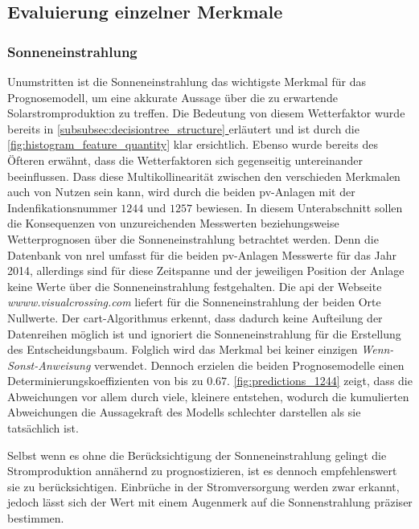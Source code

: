 \documentclass[12pt, a4paper]{article}
\newcommand*{\fullref}[1]{\hyperref[{#1}]{\autoref*{#1} \nameref*{#1}}}
\begin{document}
\subsection{Evaluierung einzelner Merkmale}

\subsubsection{Sonneneinstrahlung}

Unumstritten ist die Sonneneinstrahlung das wichtigste Merkmal für das Prognosemodell, um eine akkurate Aussage über die zu erwartende Solarstromproduktion zu treffen. Die Bedeutung von diesem Wetterfaktor wurde bereits in \fullref{subsubsec:decisiontree_structure} erläutert und ist durch die \autoref{fig:histogram_feature_quantity} klar ersichtlich. Ebenso wurde bereits des Öfteren erwähnt, dass die Wetterfaktoren sich gegenseitig untereinander beeinflussen. Dass diese Multikollinearität zwischen den verschieden Merkmalen auch von Nutzen sein kann, wird durch die beiden \ac{pv}-Anlagen mit der Indenfikationsnummer $1244$ und $1257$ bewiesen. In diesem Unterabschnitt sollen die Konsequenzen von unzureichenden Messwerten beziehungsweise Wetterprognosen über die Sonneneinstrahlung betrachtet werden. Denn die Datenbank von \ac{nrel} umfasst für die beiden \ac{pv}-Anlagen Messwerte für das Jahr 2014, allerdings sind für diese Zeitspanne und der jeweiligen Position der Anlage keine Werte über die Sonneneinstrahlung festgehalten. Die \ac{api} der Webseite \textit{wwww.visualcrossing.com} liefert für die Sonneneinstrahlung der beiden Orte Nullwerte. Der \ac{cart}-Algorithmus erkennt, dass dadurch keine Aufteilung der Datenreihen möglich ist und ignoriert die Sonneneinstrahlung für die Erstellung des Entscheidungsbaum. Folglich wird das Merkmal bei keiner einzigen \textit{Wenn-Sonst-Anweisung} verwendet. Dennoch erzielen die beiden Prognosemodelle einen Determinierungskoeffizienten von bis zu $0.67$. \autoref{fig:predictions_1244} zeigt, dass die Abweichungen vor allem durch viele, kleinere entstehen, wodurch die kumulierten Abweichungen die Aussagekraft des Modells schlechter darstellen als sie tatsächlich ist. 

Selbst wenn es ohne die Berücksichtigung der Sonneneinstrahlung gelingt die Stromproduktion annähernd zu prognostizieren, ist es dennoch empfehlenswert sie zu berücksichtigen. Einbrüche in der Stromversorgung werden zwar erkannt, jedoch lässt sich der Wert mit einem Augenmerk auf die Sonnenstrahlung präziser bestimmen.
\end{document}
